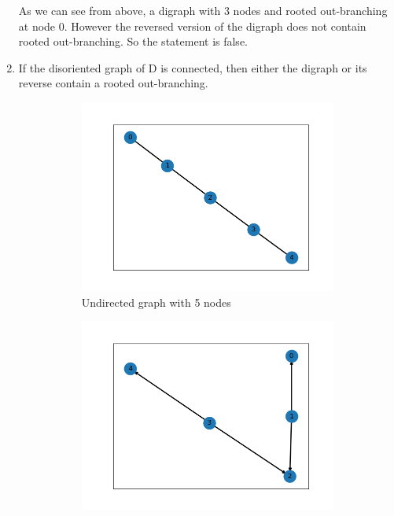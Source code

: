 \documentclass{article}
\begin{document}
\begin{problem}
\begin{enumerate}
        As we can see from above, a digraph with 3 nodes and rooted out-branching at node 0. However the reversed version of the digraph does not contain rooted out-branching. So the statement is false.
        \item If the disoriented graph of D is connected, then either the digraph or its reverse contain a rooted out-branching.
        \begin{figure}[!h]
            \centering
            \begin{subfigure}{0.3\textwidth}
                \includegraphics[width=\textwidth]{./img/p2_3.png}
                \caption{Undirected graph with 5 nodes}
            \end{subfigure}
            \begin{subfigure}{0.3\textwidth}
                \includegraphics[width=\textwidth]{./img/p2_4.png}

\end{subfigure}
\end{figure}
\end{enumerate}
\end{problem}
\end{document}
